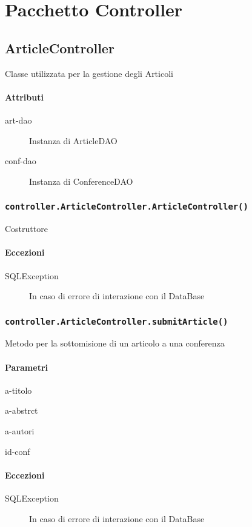 \section{Pacchetto Controller}
\label{sec:package_controller}

\subsection{ArticleController}
Classe utilizzata per la gestione degli Articoli
\paragraph{Attributi}
\begin{description}
\item[art-dao] Instanza di ArticleDAO
\item[conf-dao] Instanza di ConferenceDAO
\end{description}

\subsubsection{\texttt{controller.ArticleController.ArticleController()}}
Costruttore
\paragraph{Eccezioni}
\begin{description}
\item[SQLException] In caso di errore di interazione con il DataBase
\end{description}

\subsubsection{\texttt{controller.ArticleController.submitArticle()}}
Metodo per la sottomisione di un articolo a una conferenza
\paragraph{Parametri}
\begin{description}
\item a-titolo
\item a-abstrct
\item a-autori
\item id-conf
\end{description}
\paragraph{Eccezioni}
\begin{description}
\item[SQLException] In caso di errore di interazione con il DataBase
\end{description}
